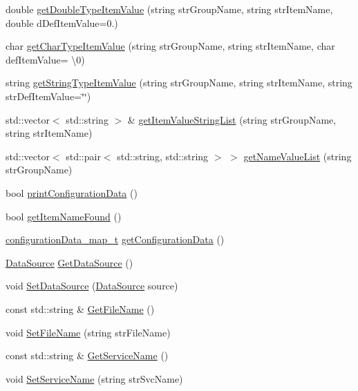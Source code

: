 \begin{DoxyCompactItemize}
\item 
double \hyperlink{classConfigurationData_aa3255f642441d984e8963896a22eeb04}{get\+Double\+Type\+Item\+Value} (string str\+Group\+Name, string str\+Item\+Name, double d\+Def\+Item\+Value=0.)
\item 
char \hyperlink{classConfigurationData_a81813d9b987a56d31b1d49db4f308746}{get\+Char\+Type\+Item\+Value} (string str\+Group\+Name, string str\+Item\+Name, char def\+Item\+Value= \textquotesingle{}\textbackslash{}0\textquotesingle{})
\item 
string \hyperlink{classConfigurationData_a59866f345224cbf203c835e0693771b9}{get\+String\+Type\+Item\+Value} (string str\+Group\+Name, string str\+Item\+Name, string str\+Def\+Item\+Value=\char`\"{}\char`\"{})
\item 
std\+::vector$<$ std\+::string $>$ \& \hyperlink{classConfigurationData_af68323f3fea60118d8150ad469bd2a0a}{get\+Item\+Value\+String\+List} (string str\+Group\+Name, string str\+Item\+Name)
\item 
std\+::vector$<$ std\+::pair$<$ std\+::string, std\+::string $>$ $>$ \hyperlink{classConfigurationData_acab5cb404d738f84daed25f604f692e4}{get\+Name\+Value\+List} (string str\+Group\+Name)
\item 
bool \hyperlink{classConfigurationData_a93380d92256f8798651a07fce30f7d83}{print\+Configuration\+Data} ()
\item 
bool \hyperlink{classConfigurationData_a7c04864007d1a78c1881b1ab83d78698}{get\+Item\+Name\+Found} ()
\item 
\hyperlink{classConfigurationData_a88b45bf304a35e4e78cfce6688087cce}{configuration\+Data\+\_\+map\+\_\+t} \hyperlink{classConfigurationData_a7a2e42c0440473858c382c39e3d66f3a}{get\+Configuration\+Data} ()
\item 
\hyperlink{classConfigurationData_a6b159be92b02274088a4de34584eeabc}{Data\+Source} \hyperlink{classConfigurationData_a10b79d03076c79b4e16aeed78f50a427}{Get\+Data\+Source} ()
\item 
void \hyperlink{classConfigurationData_ac5288ab51744fc8697a24d2663136916}{Set\+Data\+Source} (\hyperlink{classConfigurationData_a6b159be92b02274088a4de34584eeabc}{Data\+Source} source)
\item 
const std\+::string \& \hyperlink{classConfigurationData_abc7059c19e27c48a05ef4184c73a26bc}{Get\+File\+Name} ()
\item 
void \hyperlink{classConfigurationData_a54f43e41906262c4a336b370a4f1726c}{Set\+File\+Name} (string str\+File\+Name)
\item 
const std\+::string \& \hyperlink{classConfigurationData_a1deecfa52d87b2cfedf59390813bd2b3}{Get\+Service\+Name} ()
\item 
void \hyperlink{classConfigurationData_aeaa0566bed9b1c41ae77a363a811e1ce}{Set\+Service\+Name} (string str\+Svc\+Name)
\end{DoxyCompactItemize}
